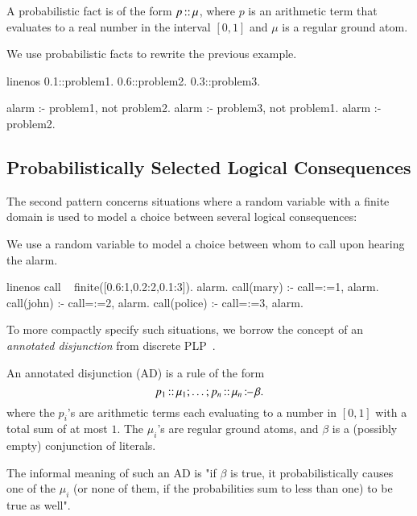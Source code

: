 \begin{definition}
    A probabilistic fact is of the form $p\operatorname*{\mathtt{{:}{:}}}\mu$, where  $p$ is an arithmetic term that evaluates to a real number in the interval $[0,1]$ and $\mu$ is a regular ground atom.
\end{definition}
\begin{example}
    We use probabilistic facts to rewrite the previous example.
    \begin{problog*}{linenos}
0.1::problem1.
0.6::problem2.
0.3::problem3.

alarm :- problem1, not problem2.
alarm :- problem3, not problem1.
alarm :- problem2.
    \end{problog*}
\end{example}



\subsection{Probabilistically Selected Logical Consequences}
The second pattern concerns situations where a random variable with a finite domain is used to model a choice between several logical consequences:
\begin{example}
    We use a random variable to model a choice between whom to call upon hearing the alarm.
    \begin{problog*}{linenos}
call ~ finite([0.6:1,0.2:2,0.1:3]).
alarm.
call(mary) :- call=:=1, alarm.
call(john) :- call=:=2, alarm.
call(police) :- call=:=3, alarm.
    \end{problog*}
\end{example}
To more compactly specify such situations, we borrow the concept of an \emph{annotated disjunction} from discrete PLP~\citep{vennekens2004logic}.

\begin{definition}
    An annotated disjunction (AD) is a rule of the form
    $$
        p_1\operatorname*{\mathtt{{:}{:}}} \mu_1; \dots; p_n \operatorname*{\mathtt{{:}{:}}} \mu_n \operatorname*{\mathtt{{:}{\---}}} \beta.
    $$
    where the  $p_i$'s are arithmetic terms each evaluating to a number in $[0,1]$ with a total sum of at most $1$. The $\mu_i$'s are regular ground atoms, and $\beta$ is a (possibly empty) conjunction of literals.
\end{definition}
The informal meaning of such an AD is "if $\beta$ is true, it probabilistically causes one of the $\mu_i$ (or none of them, if the probabilities sum to less than one) to be true as well".


